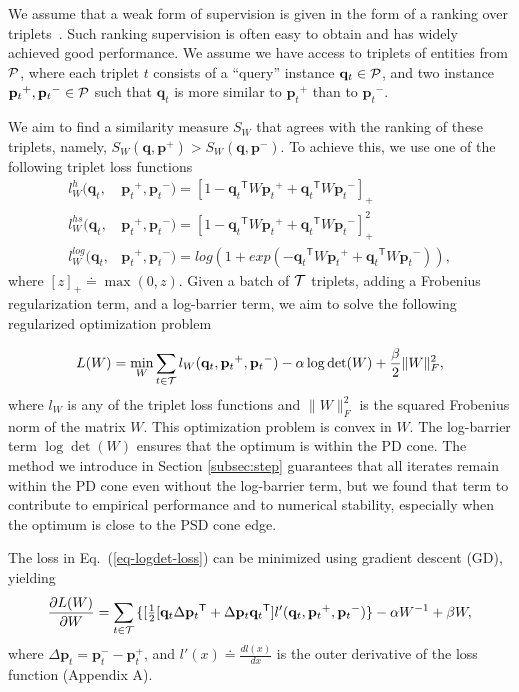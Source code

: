 \documentclass[twoside,11pt]{article}
\newcommand\mat[1]{{#1}}
\renewcommand\vec[1]{\mathbf{#1}}
\newcommand{\T}{{}^\mathsf{T}}
\newcommand{\W}{\mat{W}}
\newcommand{\eqdef}{\doteq}
\newcommand{\frobsq}[1]{{\|#1\|_F^2}}
\newcommand{\q}{{\vec{q}}}
\newcommand{\p}{{\vec{p}}}
\newcommand{\trip}{{t}}
\newcommand{\qt}{{\q_{\trip}}}
\newcommand{\pt}{{\p_{\trip}}}
\newcommand{\triplet}{(\qt, \pt^{+}, \pt^{-})}
\renewcommand{\eqref}[1]{Eq.~(\ref{#1})}
\begin{document}
We assume that a weak form of supervision is given in the form of a ranking over triplets~\citep{weinberger2006dml,OASIS,qian}. Such ranking supervision is often easy to obtain and has widely achieved good performance. We assume we have access to triplets of entities from $\cal{P}$, where each triplet $t$ consists of
a ``query'' instance $\qt \in \cal{P}$, and two instance $\pt^{+}, \pt^{-} \in \cal{P}$ such that $\qt$ is more similar to $\pt^{+}$
than to $\pt^{-}$.

We aim to find a similarity measure $S_{\W}$ that agrees with the ranking of these triplets, namely, $S_{\W}(\q, \p^{+}) > S_{\W}(\q,
\p^{-})$. To achieve this, we use one of the following triplet loss functions
\begin{align}
\label{single-triplet-lossed}
l_{\W}^h(\qt, &\pt^{+}, \pt^{-}) = [1-\qt\T\W\pt^+ + \qt\T\W\pt^-]_{+}
 \\ \nonumber
l_{\W}^{hs}(\qt, &\pt^+, \pt^-) = [1-\qt\T\W\pt^+ + \qt\T\W\pt^-]_{+}^2
 \\ \nonumber
l_{\W}^{log}(\qt, &\pt^+, \pt^-) = log(1+exp(-\qt\T\W\pt^+ + \qt\T\W\pt^-)) \nonumber ,
\end{align}
where $[z]_{+} \eqdef \max(0,z)$. Given a batch of $\cal{T}$ triplets, adding a Frobenius regularization term, and a log-barrier term, we aim to solve the following regularized optimization problem

\begin{equation}
\label{eq-logdet-loss}
L(W) = 
  \min_{\W} \sum_{\trip \in \cal{T}}  l_{\W}(\qt, \pt^+, \pt^-) - \alpha \log \det(\W) + \frac{\beta}{2} \frobsq{\W},
\end{equation}
where $l_{\W}$ is any of the triplet loss functions and $\frobsq{\W}$ is the squared Frobenius norm of the matrix $\W$. This optimization problem is convex in $\W$.
The log-barrier term $\log \det(\W)$ ensures that the optimum is within the PD cone. The method we introduce in Section \ref{subsec:step} guarantees that all iterates remain within the PD cone even without the log-barrier term, but we found that term to contribute to empirical performance and to numerical stability, especially when the optimum is close to the PSD cone edge.


The loss in \eqref{eq-logdet-loss} can be minimized using gradient descent (GD), yielding
\begin{equation}
  \frac{\partial {L (\W)}}{\partial \W} = \sum\limits_{t\in \cal{T}}{\{
  [\tfrac{1}{2}[\q_{t}\Delta\p_{t}\T + \Delta\p_{t}\q_{t}\T]  }
  {l'}\triplet\} - \alpha \W^{-1} + \beta \W,
  \label{gradMtx}
\end{equation}
where $\Delta\p_t = \p_t^- - \p_t^+$, and $l'(x) \eqdef \frac{d{l(x)}}{dx}$ is the outer derivative of the loss function (Appendix A).%
\vspace{-6pt}
\end{document}
